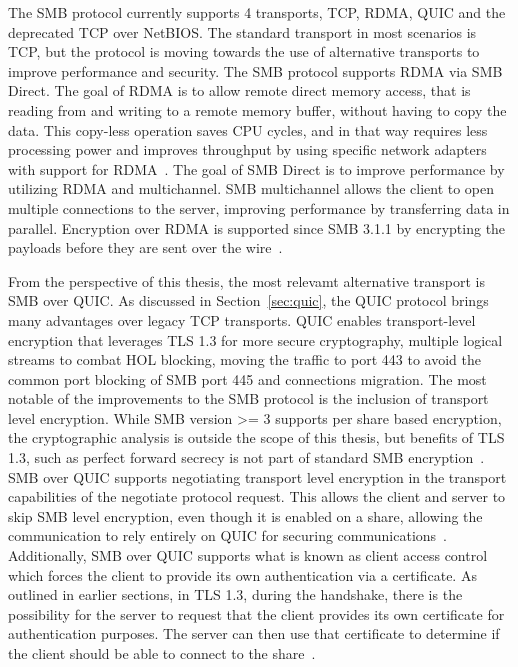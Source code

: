 \documentclass[english, 12pt, a4paper, elec, utf8, a-2b, online]{aaltothesis}
\begin{document}
The SMB protocol currently supports 4 transports, TCP, RDMA, QUIC and the
deprecated TCP over NetBIOS. The standard transport in most scenarios is TCP,
but the protocol is moving towards the use of alternative transports to improve
performance and security. The SMB protocol supports RDMA via SMB Direct. The goal
of RDMA is to allow remote direct memory access, that is reading from and writing
to a remote memory buffer, without having to copy the data. This copy-less operation saves CPU
cycles, and in that way requires less processing power and improves throughput
by using specific network adapters with support for RDMA~\cite{rfc5040}.
The goal of SMB Direct is to improve performance by utilizing RDMA
and multichannel. SMB multichannel allows the client to open multiple connections
to the server, improving performance by transferring data in parallel. Encryption over
RDMA is supported since SMB 3.1.1 by encrypting the payloads before they are sent over the
wire~\cite{smb_direct}.

From the perspective of this thesis, the most relevamt alternative transport is
SMB over QUIC. As discussed in Section~\ref{sec:quic}, the QUIC protocol brings
many advantages over legacy TCP transports. QUIC enables transport-level encryption
that leverages TLS 1.3 for more secure cryptography, multiple logical streams
to combat HOL blocking, moving the traffic to port 443 to avoid the common port
blocking of SMB port 445 and connections migration. The most notable of the improvements to the
SMB protocol is the inclusion of transport level encryption. While SMB version >= 3
supports per share based encryption, the cryptographic analysis is outside the scope
of this thesis, but benefits of TLS 1.3, such as perfect forward secrecy is not
part of standard SMB encryption~\cite{smb_quic}. SMB over QUIC supports negotiating
transport level encryption in the transport capabilities of the negotiate protocol
request. This allows the client and server to skip SMB level encryption, even though
it is enabled on a share, allowing the communication to rely entirely on QUIC for
securing communications~\cite{smb2_tech}. Additionally, SMB over QUIC supports what is
known as client access control which forces the client to provide its own authentication
via a certificate. As outlined in earlier sections, in TLS 1.3,
during the handshake,  there is the possibility for the server to request that the client
provides its own certificate for authentication purposes. The server can then use
that certificate to determine if the client should be able to connect to the share~\cite{smb_quic_cac}.
\end{document}
